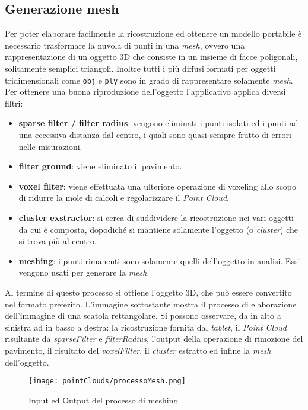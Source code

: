\subsection{Generazione mesh}
Per poter elaborare facilmente la ricostruzione ed ottenere un modello portabile è necessario trasformare la nuvola di punti in una \emph{mesh}, ovvero una rappresentazione di un oggetto 3D che consiste in un insieme di facce poligonali, solitamente semplici triangoli. Inoltre tutti i più diffusi formati per oggetti tridimensionali come \texttt{obj} e \texttt{ply} sono in grado di rappresentare solamente \emph{mesh}.\\
Per ottenere una buona riproduzione dell'oggetto l'applicativo applica diversi filtri:
\begin{itemize}
	\item \textbf{sparse filter / filter radius}: vengono eliminati i punti isolati ed i punti ad una eccessiva distanza dal centro, i quali sono quasi sempre frutto di errori nelle misurazioni.
	\item \textbf{filter ground}: viene eliminato il pavimento.
	\item \textbf{voxel filter}: viene effettuata una ulteriore operazione di voxeling allo scopo di ridurre la mole di calcoli e regolarizzare il \emph{Point Cloud}.
	\item \textbf{cluster exstractor}: si cerca di suddividere la ricostruzione nei vari oggetti da cui è composta, dopodiché si mantiene solamente l'oggetto (o \emph{cluster}) che si trova più al centro.
	\item \textbf{meshing}: i punti rimanenti sono solamente quelli dell'oggetto in analisi. Essi vengono usati per generare la \emph{mesh}.
\end{itemize}
Al termine di questo processo si ottiene l'oggetto 3D, che può essere convertito nel formato preferito. L'immagine sottostante mostra il processo di elaborazione dell'immagine di una scatola rettangolare. Si possono osservare, da in alto a sinistra ad in basso a destra: la ricostruzione fornita dal \emph{tablet}, il \emph{Point Cloud} risultante da \emph{sparseFilter} e \emph{filterRadius}, l'output della operazione di rimozione del pavimento, il risultato del \emph{voxelFilter}, il \emph{cluster} estratto ed infine la \emph{mesh} dell'oggetto.
\begin{figure}[!h] 
    \centering 
    \texttt{[image: pointClouds/processoMesh.png]} 
    \caption{Input ed Output del processo di meshing}
\end{figure}

